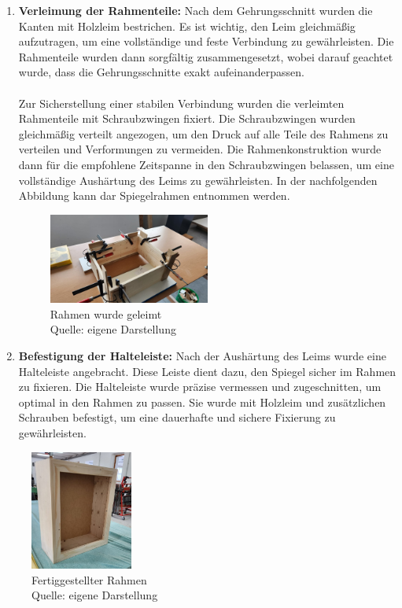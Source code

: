 \begin{enumerate}
    \item \textbf{Verleimung der Rahmenteile:}
    Nach dem Gehrungsschnitt wurden die Kanten mit Holzleim bestrichen. Es ist wichtig, den Leim gleichmäßig aufzutragen, um eine vollständige und feste Verbindung zu gewährleisten. Die Rahmenteile wurden dann sorgfältig zusammengesetzt, wobei darauf geachtet wurde, dass die Gehrungsschnitte exakt aufeinanderpassen. \\ \\
Zur Sicherstellung einer stabilen Verbindung wurden die verleimten Rahmenteile mit Schraubzwingen fixiert. Die Schraubzwingen wurden gleichmäßig verteilt angezogen, um den Druck auf alle Teile des Rahmens zu verteilen und Verformungen zu vermeiden. Die Rahmenkonstruktion wurde dann für die empfohlene Zeitspanne in den Schraubzwingen belassen, um eine vollständige Aushärtung des Leims zu gewährleisten. In der nachfolgenden Abbildung kann dar Spiegelrahmen entnommen werden.

\begin{figure}[h]
    \centering
    \includegraphics[width=0.5\textwidth]{pictures/Rahmen_geleimt.jpg}
  \captionsetup{justification=centering, labelformat=simple, singlelinecheck=false}
    \caption[Rahmen wurde geleimt]{Rahmen wurde geleimt\\ Quelle: eigene Darstellung}
\end{figure}
    
    \item \textbf{Befestigung der Halteleiste:}
    Nach der Aushärtung des Leims wurde eine Halteleiste angebracht. Diese Leiste dient dazu, den Spiegel sicher im Rahmen zu fixieren. Die Halteleiste wurde präzise vermessen und zugeschnitten, um optimal in den Rahmen zu passen. Sie wurde mit Holzleim und zusätzlichen Schrauben befestigt, um eine dauerhafte und sichere Fixierung zu gewährleisten.
\end{enumerate}
\begin{figure}[h]
    \centering
    \includegraphics[width=0.3\textwidth]{pictures/Rahmen_fertig.jpg}
  \captionsetup{justification=centering, labelformat=simple, singlelinecheck=false}
    \caption[Fertiggestellter Rahmen]{Fertiggestellter Rahmen\\ Quelle: eigene Darstellung}
\end{figure}
\newpage

